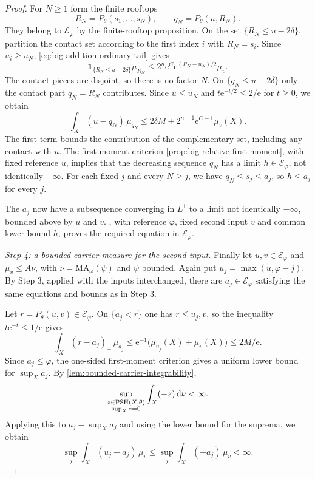 \begin{proof}
For $N\geq1$ form the finite rooftops
\[
 R_N=P_\theta(s_1,\ldots,s_N),\qquad q_N=P_\theta(u,R_N).
\]
They belong to $\mathcal E_\varphi$ by the finite-rooftop proposition. On the set $\{R_N\leq u-2\delta\}$, partition the contact set according to the first index $i$ with $R_N=s_i$. Since $u_i\geq u_N$, \eqref{eq:big-addition-ordinary-tail} gives
\[
 \mathbf1_{\{R_N\leq u-2\delta\}}\mu_{R_N}
 \leq2^n \mathrm{e}^C \mathrm{e}^{(R_N-u_N)/2}\mu_v.
\]
The contact pieces are disjoint, so there is no factor $N$. On $\{q_N\leq u-2\delta\}$ only the contact part $q_N=R_N$ contributes. Since $u\leq u_N$ and $t \mathrm{e}^{-t/2}\leq2/\mathrm{e}$ for $t\geq0$, we obtain
\[
 \int_X(u-q_N)\,\mu_{q_N}
 \leq 2\delta M+2^{n+1}\mathrm{e}^{C-1}\mu_v(X).
\]
The first term bounds the contribution of the complementary set, including any contact with $u$. The first-moment criterion \cref{prop:big-relative-first-moment}, with fixed reference $u$, implies that the decreasing sequence $q_N$ has a limit $h\in\mathcal E_\varphi$, not identically $-\infty$. For each fixed $j$ and every $N\geq j$, we have $q_N\leq s_j\leq a_j$, so $h\leq a_j$ for every $j$.

The $a_j$ now have a subsequence converging in $L^1$ to a limit not identically $-\infty$, bounded above by $u$ and $v$. , with reference $\varphi$, fixed second input $v$ and common lower bound $h$, proves the required equation in $\mathcal E_\varphi$.

\emph{Step 4: a bounded carrier measure for the second input.}
Finally let $u,v\in\mathcal E_\varphi$ and $\mu_v\leq A\nu$, with $\nu=\mathrm{MA}_\omega(\psi)$ and $\psi$ bounded. Again put $u_j=\max(u,\varphi-j)$. By Step 3, applied with the inputs interchanged, there are $a_j\in\mathcal E_\varphi$ satisfying the same equations and bounds as in Step 3.

Let $r=P_\theta(u,v)\in\mathcal E_\varphi$. On $\{a_j<r\}$ one has $r\leq u_j,v$, so the inequality $t \mathrm{e}^{-t}\leq1/\mathrm{e}$ gives
\[
 \int_X(r-a_j)_+\,\mu_{a_j}
 \leq \mathrm{e}^{-1}\bigl(\mu_{u_j}(X)+\mu_v(X)\bigr)\leq2M/\mathrm{e}.
\]
Since $a_j\leq\varphi$, the one-sided first-moment criterion gives a uniform lower bound for $\sup_Xa_j$. By \cref{lem:bounded-carrier-integrability},
\[
 \sup_{\substack{z\in\mathrm{PSH}(X,\theta)\\\sup_Xz=0}}
       \int_X(-z)\,\mathrm{d}\nu<\infty.
\]
Applying this to $a_j-\sup_Xa_j$ and using the lower bound for the suprema, we obtain
\begin{equation}\label{eq:big-addition-carrier-moment}
 \sup_j\int_X(u_j-a_j)\,\mu_v
 \leq\sup_j\int_X(-a_j)\,\mu_v<\infty.
\end{equation}


\end{proof}
